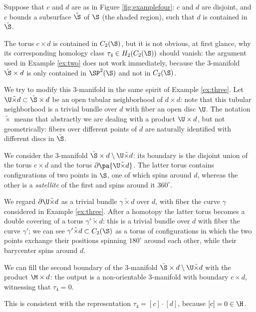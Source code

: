\begin{ex}
 \label{ex:four}
 Suppose that $c$ and $d$ are as in Figure \ref{fig:examplefour}: $c$ and $d$ are disjoint, and
 $c$ bounds a subsurface $\check{\S}$ of $\S$ (the shaded region), such that $d$ is contained in $\check{\S}$.
 
 The torus $c\times d$ is contained in $C_2(\S)$, but it is not obvious, at first glance, why its corresponding homology
 class $\tau_4\in H_2(C_2(\S))$ should vanish: the argument used in Example \ref{ex:two} does not work immediately, because the
 3-manifold $\check{\S}\times d$ is only contained in $\SP^2(\S)$ and not in $C_2(\S)$.
 
 We try to modify this 3-manifold in the same spirit of Example \ref{ex:three}. Let $\U\tilde{\times} d\subset \check{\S}\times d$
 be an open tubular neighborhood of $d\times d$: note that this tubular neighborhood is a trivial bundle over
 $d$ with fiber an open disc $\U$. The notation $\tilde{\times}$ means that abstractly we are dealing with a product $\U\times d$,
 but not geometrically: fibers over different points of $d$ are naturally identified with different discs in $\check{\S}$.
 
 We consider the 3-manifold $\check{\S}\times d\setminus \U\tilde{\times} d$: its boundary is the disjoint union
 of the torus $c\times d$ and the torus $\partial \pa{\U\tilde{\times} d}$. The latter torus contains configurations of
 two points in $\S$, one of which spins around $d$, whereas the other is a \emph{satellite} of the first and spins
 around it $360^{\circ}$.
 
 We regard $\partial \U\tilde{\times} d$ as a trivial bundle $\gamma\tilde{\times} d$ over $d$, with fiber the curve $\gamma$
 considered in Example \ref{ex:three}. After a homotopy the latter torus
 becomes a double covering of a torus $\gamma'\tilde{\times} d$: this is a trivial bundle over $d$ with fiber the curve $\gamma'$;
 we can see $\gamma'\tilde{\times} d\subset C_2(\S)$ as a torus of configurations in which the two points
 exchange their positions spinning $180^{\circ}$ around each other, while their barycenter spins around $d$.
 
 We can fill the second boundary of the $3$-manifold $\check{\S}\times d\setminus \U\tilde{\times} d$
 with the product $\M\times d$: the output is a non-orientable $3$-manifold with boundary $c\times d$, witnessing
 that $\tau_4=0$.
 
 This is consistent with the representation $\tau_4=[c]\cdot[d]$, because $[c]=0\in \H$.
\end{ex}

